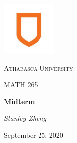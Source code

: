 \documentclass[11pt, letterpaper, twoside]{article}
\begin{document}
\begin{titlepage}
	\centering
	\vspace*{60px}
	\hspace{0pt}
	\includegraphics[width=0.2\textwidth]{logo}\par\vspace{1cm}
	{\scshape\LARGE Athabasca University \par}
	\vspace{1cm}
	{\scshape\Large MATH 265\par}
	\vspace{1.5cm}
	{\huge\bfseries Midterm\par}
	\vspace{2cm}
	{\Large\itshape Stanley Zheng\par}
	\vfill
	{\large September 25, 2020\par}
	\vspace*{50px}
	\hspace{0pt}
\pagebreak
\end{titlepage}
\end{document}
